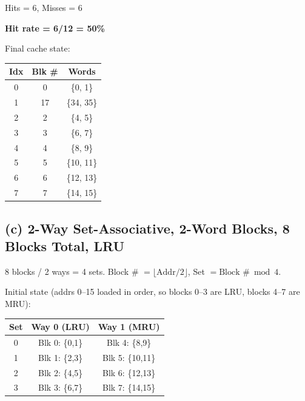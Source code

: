 \documentclass[11pt]{article}
\begin{document}
\medskip
Hits = 6, Misses = 6

\textbf{Hit rate = 6/12 = 50\%}

\medskip
Final cache state:

\begin{center}
\begin{tabular}{|c|c|c|}
\hline
\textbf{Idx} & \textbf{Blk \#} & \textbf{Words} \\
\hline
0 & 0 & \{0, 1\} \\
1 & 17 & \{34, 35\} \\
2 & 2 & \{4, 5\} \\
3 & 3 & \{6, 7\} \\
4 & 4 & \{8, 9\} \\
5 & 5 & \{10, 11\} \\
6 & 6 & \{12, 13\} \\
7 & 7 & \{14, 15\} \\
\hline
\end{tabular}
\end{center}

\newpage
\subsection*{(c) 2-Way Set-Associative, 2-Word Blocks, 8 Blocks Total, LRU}

8 blocks / 2 ways = 4 sets. Block \# $= \lfloor \text{Addr}/2 \rfloor$, \quad Set $= \text{Block \#} \bmod 4$.

Initial state (addrs 0--15 loaded in order, so blocks 0--3 are LRU, blocks 4--7 are MRU):

\begin{center}
\begin{tabular}{|c|c|c|}
\hline
\textbf{Set} & \textbf{Way 0 (LRU)} & \textbf{Way 1 (MRU)} \\
\hline
0 & Blk 0: \{0,1\} & Blk 4: \{8,9\} \\
1 & Blk 1: \{2,3\} & Blk 5: \{10,11\} \\
2 & Blk 2: \{4,5\} & Blk 6: \{12,13\} \\
3 & Blk 3: \{6,7\} & Blk 7: \{14,15\} \\
\hline
\end{tabular}
\end{center}
\end{document}
